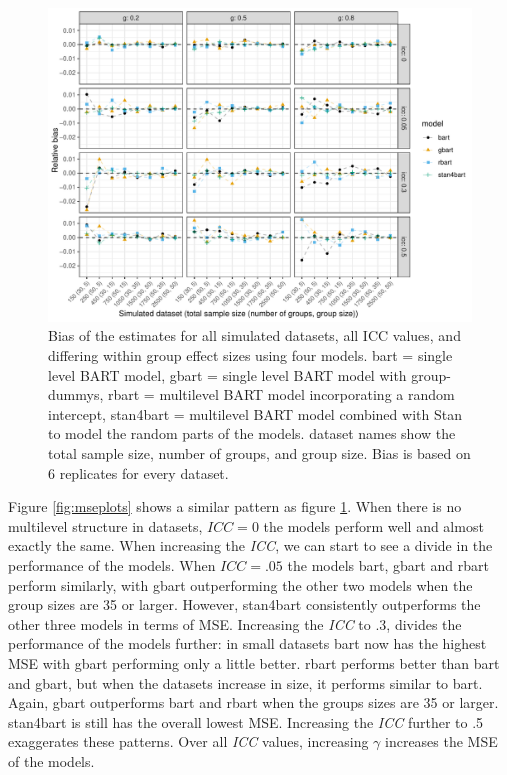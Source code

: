 \documentclass[10pt, a4paper, titlepage]{article}
\begin{document}
\begin{figure}[H]
\caption{Bias of the estimates for all simulated datasets, all ICC values, and differing within group effect sizes using four models. bart = single level BART model, gbart = single level BART model with group-dummys, rbart = multilevel BART model incorporating a random intercept, stan4bart = multilevel BART model combined with Stan to model the random parts of the models. dataset names show the total sample size, number of groups, and group size. Bias is based on 6 replicates for every dataset.}
\centering
\label{fig:biasplots}
\includegraphics[width=\textwidth]{biasplots4.pdf}
\end{figure}

Figure \ref{fig:mseplots} shows a similar pattern as figure \ref{fig:biasplots}. When there is no multilevel structure in datasets, $ICC = 0$ the models perform well and almost exactly the same. When increasing the \textit{ICC}, we can start to see a divide in the performance of the models. When $ICC = .05$ the models bart, gbart and rbart perform similarly, with gbart outperforming the other two models when the group sizes are 35 or larger. However, stan4bart consistently outperforms the other three models in terms of MSE. Increasing the \textit{ICC} to .3, divides the performance of the models further: in small datasets bart now has the highest MSE with gbart performing only a little better. rbart performs better than bart and gbart, but when the datasets increase in size, it performs similar to bart. Again, gbart outperforms bart and rbart when the groups sizes are 35 or larger. stan4bart is still has the overall lowest MSE. Increasing the \textit{ICC} further to .5 exaggerates these patterns. Over all \textit{ICC} values, increasing $\gamma$ increases the MSE of the models.
\end{document}
